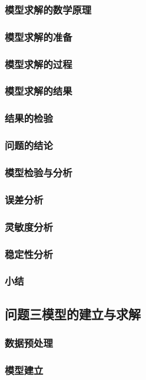 \documentclass{ctexart}
\begin{document}
\subsubsection{模型求解的数学原理}
\subsubsection{模型求解的准备}
\subsubsection{模型求解的过程}
\subsubsection{模型求解的结果}
\subsubsection{结果的检验}
\subsubsection{问题的结论}
\subsubsection{模型检验与分析}
\subsubsection{误差分析}
\subsubsection{灵敏度分析}
\subsubsection{稳定性分析}
\subsubsection{小结}
    \subsection{问题三模型的建立与求解}
\subsubsection{数据预处理}
\subsubsection{模型建立}
\end{document}
